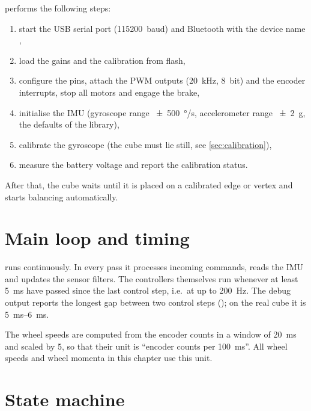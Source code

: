 performs the following steps:
\begin{enumerate}
  \item start the USB serial port (\SI{115200}{baud}) and Bluetooth with the device name
        ,
  \item load the gains and the calibration from flash,
  \item configure the pins, attach the PWM outputs (\SI{20}{kHz}, 8~bit) and the encoder
        interrupts, stop all motors and engage the brake,
  \item initialise the IMU (gyroscope range \SI{\pm 500}{\degree/s}, accelerometer range
        \SI{\pm 2}{g}, the defaults of the library),
  \item calibrate the gyroscope (the cube must lie still, see \cref{sec:calibration}),
  \item measure the battery voltage and report the calibration status.
\end{enumerate}
After that, the cube waits until it is placed on a calibrated edge or vertex and starts balancing
automatically.

\section{Main loop and timing}

 runs continuously. In every pass it processes incoming commands, reads the IMU and
updates the sensor filters. The controllers themselves run whenever at least \SI{5}{ms} have
passed since the last control step, i.e.\ at up to \SI{200}{Hz}. The debug output reports the
longest gap between two control steps (); on the real cube it is \SIrange{5}{6}{ms}.

The wheel speeds are computed from the encoder counts in a window of \SI{20}{ms} and scaled by 5,
so that their unit is \enquote{encoder counts per \SI{100}{ms}}. All wheel speeds and wheel
momenta in this chapter use this unit.

\section{State machine}
\label{sec:state_machine}

